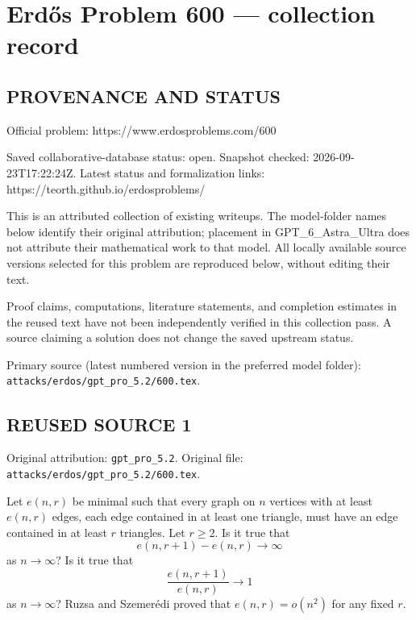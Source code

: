 \section*{Erd\H{o}s Problem 600 --- collection record}

\subsection*{PROVENANCE AND STATUS}
Official problem: https://www.erdosproblems.com/600

Saved collaborative-database status: open.
Snapshot checked: 2026-09-23T17:22:24Z.
Latest status and formalization links: https://teorth.github.io/erdosproblems/

This is an attributed collection of existing writeups. The model-folder names below identify their original attribution; placement in GPT\_6\_Astra\_Ultra does not attribute their mathematical work to that model. All locally available source versions selected for this problem are reproduced below, without editing their text.

Proof claims, computations, literature statements, and completion estimates in the reused text have not been independently verified in this collection pass. A source claiming a solution does not change the saved upstream status.

Primary source (latest numbered version in the preferred model folder): \texttt{attacks/erdos/gpt\_pro\_5.2/600.tex}.

\subsection*{REUSED SOURCE 1}
Original attribution: \texttt{gpt\_pro\_5.2}.
Original file: \texttt{attacks/erdos/gpt\_pro\_5.2/600.tex}.


Let $e(n,r)$ be minimal such that every graph on $n$ vertices with at least $e(n,r)$ edges, each edge contained in at least one triangle, must have an edge contained in at least $r$ triangles. Let $r\geq 2$. Is it true that\[e(n,r+1)-e(n,r)\to \infty\]
as $n\to \infty$? Is it true that\[\frac{e(n,r+1)}{e(n,r)}\to 1\]
as $n\to \infty$? Ruzsa and Szemer\'{e}di \cite{RuSz78} proved that $e(n,r)=o(n^2)$ for any fixed $r$.

